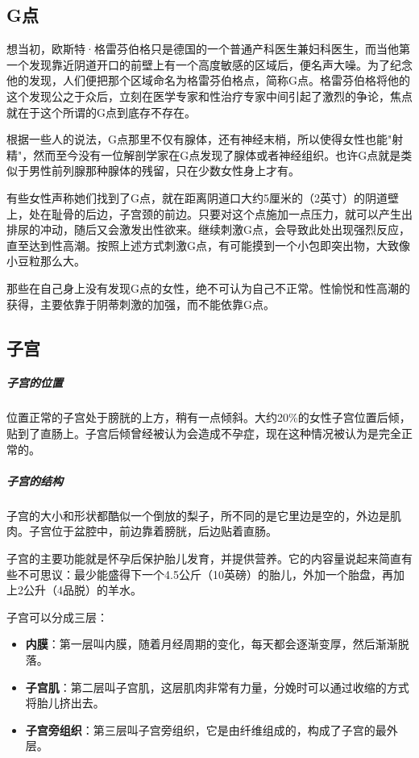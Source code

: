 \begin{enumerate}
\subsection{G点}

想当初，欧斯特·格雷芬伯格只是德国的一个普通产科医生兼妇科医生，而当他第一个发现靠近阴道开口的前壁上有一个高度敏感的区域后，便名声大噪。为了纪念他的发现，人们便把那个区域命名为格雷芬伯格点，简称G点。格雷芬伯格将他的这个发现公之于众后，立刻在医学专家和性治疗专家中间引起了激烈的争论，焦点就在于这个所谓的G点到底存不存在。

根据一些人的说法，G点那里不仅有腺体，还有神经末梢，所以使得女性也能"射精"，然而至今没有一位解剖学家在G点发现了腺体或者神经组织。也许G点就是类似于男性前列腺那种腺体的残留，只在少数女性身上才有。

有些女性声称她们找到了G点，就在距离阴道口大约5厘米的（2英寸）的阴道壁上，处在耻骨的后边，子宫颈的前边。只要对这个点施加一点压力，就可以产生出排尿的冲动，随后又会激发出性欲来。继续刺激G点，会导致此处出现强烈反应，直至达到性高潮。按照上述方式刺激G点，有可能摸到一个小包即突出物，大致像小豆粒那么大。

那些在自己身上没有发现G点的女性，绝不可认为自己不正常。性愉悦和性高潮的获得，主要依靠于阴蒂刺激的加强，而不能依靠G点。

\subsection{子宫}

\subparagraph{子宫的位置}

位置正常的子宫处于膀胱的上方，稍有一点倾斜。大约20\%的女性子宫位置后倾，贴到了直肠上。子宫后倾曾经被认为会造成不孕症，现在这种情况被认为是完全正常的。

\subparagraph{子宫的结构}

子宫的大小和形状都酷似一个倒放的梨子，所不同的是它里边是空的，外边是肌肉。子宫位于盆腔中，前边靠着膀胱，后边贴着直肠。

子宫的主要功能就是怀孕后保护胎儿发育，并提供营养。它的内容量说起来简直有些不可思议：最少能盛得下一个4.5公斤（10英磅）的胎儿，外加一个胎盘，再加上2公升（4品脱）的羊水。

子宫可以分成三层：
\begin{itemize}
    \item \textbf{内膜}：第一层叫内膜，随着月经周期的变化，每天都会逐渐变厚，然后渐渐脱落。
    \item \textbf{子宫肌}：第二层叫子宫肌，这层肌肉非常有力量，分娩时可以通过收缩的方式将胎儿挤出去。
    \item \textbf{子宫旁组织}：第三层叫子宫旁组织，它是由纤维组成的，构成了子宫的最外层。
\end{itemize}


\end{enumerate}
